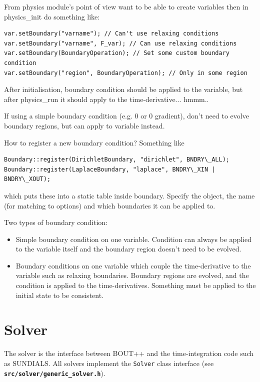 \documentclass[12pt]{article}
\newcommand{\code}[1]{\texttt{#1}}
\newcommand{\file}[1]{\texttt{\bf #1}}
\begin{document}
From physics module's point of view want to be able to create variables
then in physics\_init do something like:
\begin{lstlisting}
var.setBoundary("varname"); // Can't use relaxing conditions
var.setBoundary("varname", F_var); // Can use relaxing conditions
var.setBoundary(BoundaryOperation); // Set some custom boundary condition
var.setBoundary("region", BoundaryOperation); // Only in some region
\end{lstlisting}

After initialisation, boundary condition should be applied to the variable,
but after physics\_run it should apply to the time-derivative... hmmm..

If using a simple boundary condition (e.g. 0 or 0 gradient), don't need
to evolve boundary regions, but can apply to variable instead.


How to register a new boundary condition? Something like
\begin{lstlisting}
Boundary::register(DirichletBoundary, "dirichlet", BNDRY\_ALL);
Boundary::register(LaplaceBoundary, "laplace", BNDRY\_XIN | BNDRY\_XOUT);
\end{lstlisting}
which puts these into a static table inside boundary. Specify the object, 
the name (for matching to options) and which boundaries it can be applied to.

Two types of boundary condition:
\begin{itemize}
\item Simple boundary condition on one variable. Condition can always be applied
  to the variable itself and the boundary region doesn't need to be evolved.
\item Boundary conditions on one variable which couple the time-derivative to the variable
  such as relaxing boundaries. Boundary regions are evolved, and the condition is applied
  to the time-derivatives. Something must be applied to the initial state to be
  consistent.
\end{itemize}

\section{Solver}

The solver is the interface between BOUT++ and the time-integration code
such as SUNDIALS. All solvers implement the \code{Solver} class
interface (see \file{src/solver/generic\_solver.h}).
\end{document}
